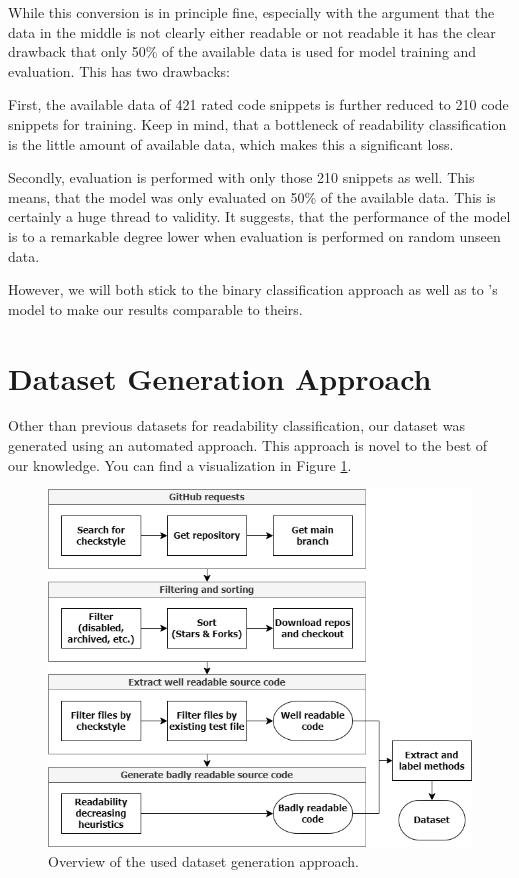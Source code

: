 \documentclass[%
class=scrreprt,
chapterprefix=false,%
open=right,%
twoside=false,%
paper=a4,%
logofile={Logo\_zentral\_farbig\_EN.png},%
thesistype=master,%
UKenglish,%
]{se2thesis}
\begin{document}
	While this conversion is in principle fine, especially with the argument that the data in the middle is not clearly either readable or not readable it has the clear drawback that only 50\% of the available data is used for model training and evaluation. This has two drawbacks:
	
	First, the available data of 421 rated code snippets is further reduced to 210 code snippets for training. Keep in mind, that a bottleneck of readability classification is the little amount of available data, which makes this a significant loss.
	
	Secondly, evaluation is performed with only those 210 snippets as well. This means, that the model was only evaluated on 50\% of the available data. This is certainly a huge thread to validity. It suggests, that the performance of the model is to a remarkable degree lower when evaluation is performed on random unseen data.
	
	However, we will both stick to the binary classification approach as well as to \citeauthor{mi2022towards}'s model to make our results comparable to theirs.	
	
\section{Dataset Generation Approach} \label{Dataset Generation Approach}
	Other than previous datasets for readability classification, our dataset was generated using an automated approach. This approach is novel to the best of our knowledge. You can find a visualization in Figure \ref{fig:dataset_generation}.
	
	\begin{figure}[t]
		\centering
		\includegraphics[width=\textwidth]{img/dataset_generation.png}
		\caption{Overview of the used dataset generation approach.}
		\label{fig:dataset_generation}
	\end{figure}
	
\end{document}
